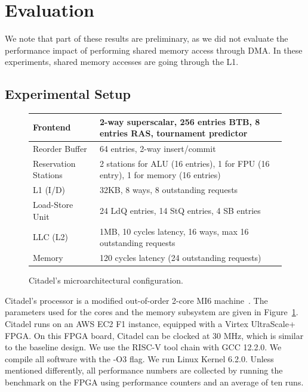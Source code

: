\section{Evaluation}
\label{sec:eval}

We note that part of these results are preliminary, as we did not evaluate the performance impact of performing shared memory access through DMA.
In these experiments, shared memory accesses are going through the L1.


\subsection{Experimental Setup}

\begin{figure}
\begin{tabular}{ | m{5em} | m{17em} | } 
  \hline
  Frontend & 2-way superscalar, 256 entries BTB, 8 entries RAS, tournament predictor \\
  \hline
  Reorder Buffer &  64 entries, 2-way insert/commit \\
  \hline
  Reservation Stations & 2 stations for ALU (16 entries), 1 for FPU (16 entry), 1 for memory (16 entries) \\
  \hline
  L1 (I/D) &  32KB, 8 ways, 8 outstanding requests \\
  \hline
  Load-Store Unit & 24 LdQ entries, 14 StQ entries, 4 SB entries\\
  \hline
  LLC (L2) & 1MB, 10 cycles latency, 16 ways, max 16 outstanding requests \\
  \hline
  Memory &  120 cycles latency (24 outstanding requests) \\
  \hline
\end{tabular}
    \caption{Citadel's microarchitectural configuration.}
    \label{tab:mi6param}
\end{figure}
Citadel's processor is a modified out-of-order 2-core MI6 machine~\cite{bourgeat2019mi6}.
The parameters used for the cores and the memory subsystem are given in Figure~\ref{tab:mi6param}.
Citadel runs on an AWS EC2 F1 instance, equipped with a Virtex UltraScale+ FPGA. 
On this FPGA board, Citadel can be clocked at $30$ MHz, which is similar to the baseline design.
We use the RISC-V tool chain with GCC 12.2.0.
We compile all software with the -O3 flag. 
We run Linux Kernel 6.2.0.
Unless mentioned differently, all performance numbers are collected by running the benchmark on the FPGA using performance counters and an average of ten runs. 

